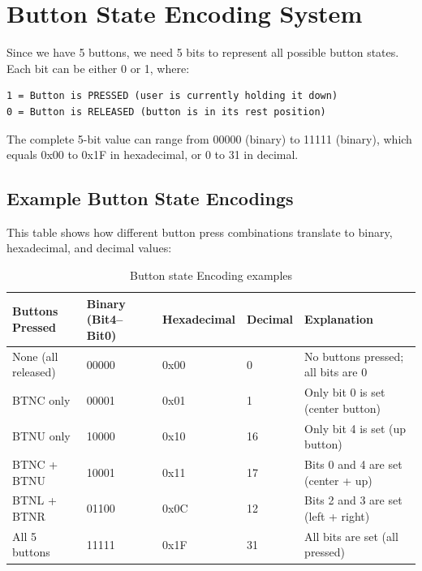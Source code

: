 \section{Button State Encoding System}
Since we have 5 buttons, we need 5 bits to represent all possible button states. Each bit can be either 0 or 1, where:

\begin{verbatim}
1 = Button is PRESSED (user is currently holding it down)
0 = Button is RELEASED (button is in its rest position)
\end{verbatim}

The complete 5-bit value can range from 00000 (binary) to 11111 (binary), which equals 0x00 to 0x1F in hexadecimal, or 0 to 31 in decimal.

\subsection{Example Button State Encodings}
This table shows how different button press combinations translate to binary, hexadecimal, and decimal values:

\begin{table}[H]
    \centering
    \caption{Button Press Combinations and Their Binary, Hexadecimal, and Decimal Values}
    \begin{tabular}{|l|l|l|l|l|}
        \hline
        \textbf{Buttons Pressed} & \textbf{Binary (Bit4--Bit0)} & \textbf{Hexadecimal} & \textbf{Decimal} & \textbf{Explanation} \\
        \hline
        None (all released) & 00000 & 0x00 & 0  & No buttons pressed; all bits are 0 \\
        \hline
        BTNC only           & 00001 & 0x01 & 1  & Only bit 0 is set (center button) \\
        \hline
        BTNU only           & 10000 & 0x10 & 16 & Only bit 4 is set (up button) \\
        \hline
        BTNC + BTNU         & 10001 & 0x11 & 17 & Bits 0 and 4 are set (center + up) \\
        \hline
        BTNL + BTNR         & 01100 & 0x0C & 12 & Bits 2 and 3 are set (left + right) \\
        \hline
        All 5 buttons       & 11111 & 0x1F & 31 & All bits are set (all pressed) \\
        \hline
    \end{tabular}
    \caption{Button state Encoding examples}
    \label{tab:button-combinations}
\end{table}


